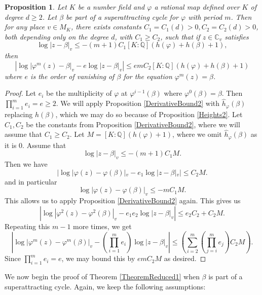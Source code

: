 \documentclass[10pt, reqno]{amsart}
\newcommand{\bb}{\mathbb}
\newcommand{\vphi}{\varphi}
\newcommand{\h}{\widehat{h}}
\numberwithin{theorem}{section}
\newtheorem{proposition}[theorem]{Proposition}
\numberwithin{equation}{section}
\numberwithin{example}{section}
\numberwithin{definition}{section}
\begin{document}
\begin{proposition} \label{DerivativeBound3}
Let $K$ be a number field and $\vphi$ a rational map defined over $K$ of degree $d \geq 2$. Let $\beta$ be part of a superattracting cycle for $\vphi$ with period $m$. Then for any place $v \in M_K$, there exists constants $C_1 = C_1 (d) > 0, C_2 = C_2(d) > 0$, both depending only on the degree $d$, with $C_1 \geq C_2$, such that if $z \in \bb{C}_v$ satisfies 
\begin{equation} \label{eq: SuperAttracting2}
\log |z-\beta|_v \leq -(m+1)C_1[K:\bb{Q}](h(\vphi) + h(\beta)+1),
\end{equation}
then
$$\left| \log |\vphi^m(z)-\beta|_v - e \log |z-\beta|_v \right| \leq emC_2 [K:\bb{Q}](h(\vphi) + h(\beta) + 1)$$
where $e$ is the order of vanishing of $\beta$ for the equation $\vphi^m(z) = \beta$. 
\end{proposition}

\begin{proof}
Let $e_i$ be the multiplicity of $\vphi$ at $\vphi^{i-1}(\beta)$ where $\vphi^{0}(\beta) = \beta$. Then $\prod_{i=1}^{m} e_i = e \geq 2$. We will apply Proposition \ref{DerivativeBound2} with $\h_{\vphi}(\beta)$ replacing $h(\beta)$, which we may do so because of Proposition \ref{Heights2}. Let $C_1,C_2$ be the constants from Proposition \ref{DerivativeBound2}, where we will assume that $C_1 \geq C_2$. Let $M = [K:\bb{Q}](h(\vphi) +1)$, where we omit $\h_{\vphi}(\beta)$ as it is $0$. Assume that 
$$\log |z-\beta|_v \leq - (m+1)C_1 M.$$
Then we have 
$$|\log |\vphi(z) - \vphi(\beta)|_v - e_1 \log |z-\beta|_v| \leq C_2 M.$$
and in particular 
$$\log |\vphi(z) - \vphi(\beta)|_v \leq -mC_1 M.$$
This allows us to apply Proposition \ref{DerivativeBound2} again. This gives us 
$$\left| \log |\vphi^2(z) - \vphi^2(\beta)|_v - e_1 e_2 \log |z-\beta|_v \right| \leq e_2 C_2  + C_2M.$$
Repeating this $m-1$ more times, we get
$$\left|\log |\vphi^m(z) - \vphi^m(\beta)|_v - \left( \prod_{i=1}^{m} e_i \right) \log |z-\beta|_v \right| \leq \left(\sum_{i=2}^{m} \left(\prod_{j=i}^{m} e_j \right) C_2 M \right).$$
Since $\prod_{i=1}^{m} e_i = e$, we may bound this by 
$em C_2M$ as desired.


\end{proof}

We now begin the proof of Theorem \ref{TheoremReduced1} when $\beta$ is part of a superattracting cycle. Again, we keep the following assumptions: 
\end{document}
